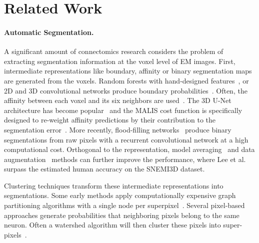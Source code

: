 \section{Related Work}

\paragraph{Automatic Segmentation.}
A significant amount of connectomics research considers the problem of extracting segmentation information at the voxel level of EM images.
First, intermediate representations like boundary, affinity or binary segmentation maps are generated from the voxels.
Random forests with hand-designed features~\cite{kaynig2015large}, or 2D and 3D convolutional networks produce boundary probabilities~\cite{seymour2016rhoananet,ronneberger2015u,bogovic2013learned,ciresan2012deep,jain2010boundary,amelio_segmentation}.
Often, the affinity between each voxel and its six neighbors are used~\cite{lee2015recursive,parag2017anisotropic,lee2017superhuman,cciccek20163d,turaga2010convolutional}. 
The 3D U-Net architecture has become popular~\cite{cciccek20163d} and the MALIS cost function is specifically designed to re-weight affinity predictions by their contribution to the segmentation error~\cite{briggman2009maximin}.
More recently, flood-filling networks~\cite{januszewski2016flood} produce binary segmentations from raw pixels with a recurrent convolutional network at a high computational cost.
Orthogonal to the representation, model averaging~\cite{zeng2017deepem3d} and data augmentation~\cite{lee2017superhuman} methods can further improve the performance, where Lee et al.~\cite{lee2017superhuman} surpass the estimated human accuracy on the SNEMI3D dataset.

Clustering techniques transform these intermediate representations into segmentations.
Some early methods apply computationally expensive graph partitioning algorithms with a single node per superpixel~\cite{andres2012globally}.
Several pixel-based approaches generate probabilities that neighboring pixels belong to the same neuron.
Often a watershed algorithm will then cluster these pixels into super-pixels~\cite{zlateski2015image}.

